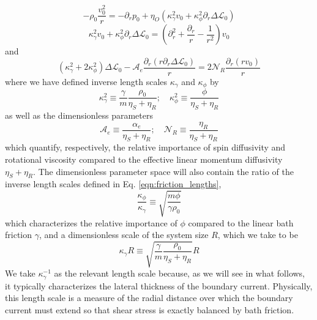 \documentclass[%
 reprint,
superscriptaddress,
longbibliography,
 amsmath,amssymb,
 prl,
 citeautoscript,
]{revtex4-1}
\begin{document}
\begin{equation}
- \rho_0 \frac{v_0^2}{r} = - \partial_r p_0 + \eta_O \left( \kappa_{\gamma}^2 v_0 + \kappa_{\phi}^2 \partial_r \Delta \mathcal{L}_0 \right)
\label{eqn:pressure_eqn_boundary_current}
\end{equation}
\begin{equation}
\kappa_{\gamma}^2 v_0 + \kappa_{\phi}^2 \partial_r \Delta \mathcal{L}_0 = \left( \partial_r^2 + \frac{\partial_r}{r} - \frac{1}{r^2} \right) v_0
\label{eqn:velocity_eqn_boundary_current}
\end{equation}
and
\begin{equation}
\left( \kappa_{\gamma}^2 + 2 \kappa_{\phi}^2 \right) \Delta \mathcal{L}_0 - \mathcal{A}_e \frac{\partial_r \left( r \partial_r \Delta \mathcal{L}_0 \right)}{r} = 2 \mathcal{N}_R \frac{\partial_r \left( r v_0 \right)}{r}
\label{eqn:spin_eqn_boundary_current}
\end{equation}
where we have defined inverse length scales $\kappa_{\gamma}$ and $\kappa_{\phi}$ by
\begin{equation}
\kappa_{\gamma}^2 \equiv \frac{\gamma}{m} \frac{\rho_0}{\eta_S + \eta_R}; \quad \kappa_{\phi}^2 \equiv \frac{\phi}{\eta_S + \eta_R}
\label{eqn:friction_lengths}
\end{equation}
as well as the dimensionless parameters
\begin{equation}
\mathcal{A}_e \equiv \frac{\alpha_e}{\eta_S + \eta_R}; \quad \mathcal{N}_R \equiv \frac{\eta_R}{\eta_S + \eta_R}
\label{eqn:dim_params}
\end{equation}
which quantify, respectively, the relative importance of spin diffusivity and rotational viscosity compared to the effective linear momentum diffusivity $\eta_S + \eta_R$. The dimensionless parameter space will also contain the ratio of the inverse length scales defined in Eq. \ref{eqn:friction_lengths},
\begin{equation}
\frac{\kappa_{\phi}}{\kappa_{\gamma}} \equiv \sqrt{ \frac{m \phi}{\gamma \rho_0} }
\label{eqn:length_ratio}
\end{equation}
which characterizes the relative importance of $\phi$ compared to the linear bath friction $\gamma$, and a dimensionless scale of the system size $R$, which we take to be
\begin{equation}
\kappa_{\gamma} R \equiv \sqrt{ \frac{\gamma}{m} \frac{\rho_0}{\eta_S + \eta_R} } R
\label{eqn:dim_system_size}
\end{equation}
We take $\kappa_{\gamma}^{-1}$ as the relevant length scale because, as we will see in what follows, it typically characterizes the lateral thickness of the boundary current. Physically, this length scale is a measure of the radial distance over which the boundary current must extend so that shear stress is exactly balanced by bath friction.
\end{document}
